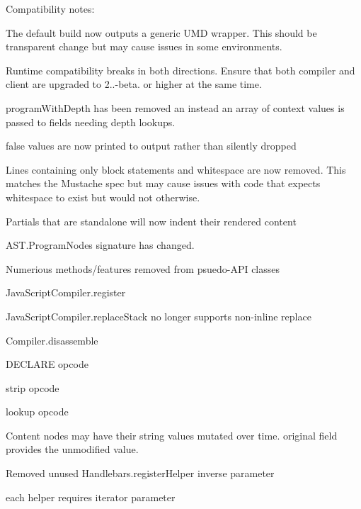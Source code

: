 Compatibility notes\+:
\begin{DoxyItemize}
\item The default build now outputs a generic U\+M\+D wrapper. This should be transparent change but may cause issues in some environments.
\item Runtime compatibility breaks in both directions. Ensure that both compiler and client are upgraded to 2..-\/beta. or higher at the same time.
\begin{DoxyItemize}
\item {\ttfamily program\+With\+Depth} has been removed an instead an array of context values is passed to fields needing depth lookups.
\end{DoxyItemize}
\item {\ttfamily false} values are now printed to output rather than silently dropped
\item Lines containing only block statements and whitespace are now removed. This matches the Mustache spec but may cause issues with code that expects whitespace to exist but would not otherwise.
\item Partials that are standalone will now indent their rendered content
\item {\ttfamily A\+S\+T.\+Program\+Node}\textquotesingle{}s signature has changed.
\item Numerious methods/features removed from psuedo-\/\+A\+P\+I classes
\begin{DoxyItemize}
\item {\ttfamily Java\+Script\+Compiler.\+register}
\item {\ttfamily Java\+Script\+Compiler.\+replace\+Stack} no longer supports non-\/inline replace
\item {\ttfamily Compiler.\+disassemble}
\item {\ttfamily D\+E\+C\+L\+A\+R\+E} opcode
\item {\ttfamily strip} opcode
\item {\ttfamily lookup} opcode
\item Content nodes may have their {\ttfamily string} values mutated over time. {\ttfamily original} field provides the unmodified value.
\end{DoxyItemize}
\item Removed unused {\ttfamily Handlebars.\+register\+Helper} {\ttfamily inverse} parameter
\item {\ttfamily each} helper requires iterator parameter
\end{DoxyItemize}

